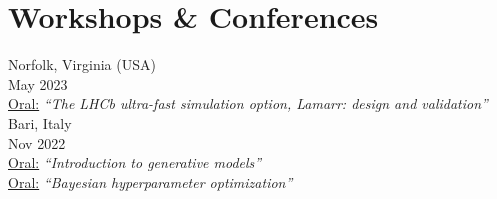 \newcommand{\contribution}[3][]
  {\normalsize \color{maincolor} \ul{#2:} \emph{``#3''} {#1}}

\newcommand{\nohref}
  {\normalsize \color{hlcolor-2} {-}}
  

\section*{Workshops \& Conferences}
\begin{cvcontent}
  \hypertarget{chep-2023}{\null}\noindent
    {Norfolk, Virginia (USA)}\\ [0.5mm]
    {May 2023}\\ [0.5mm]
  \contribution{Oral}{The LHCb ultra-fast simulation option, Lamarr: design and validation}
  \hfill
  \href{https://indico.jlab.org/event/459/contributions/11454/attachments/9426/14314/Lamarr_mbarbetti_CHEP2023.pdf}{\faFilePdf[regular]}
  \href{https://indico.jlab.org/event/459/contributions/11454}{\faGlobe}
  \\ [5mm]
  \hypertarget{mlinfn-2022}{\null}\noindent
    {Bari, Italy}\\ [0.5mm]
    {Nov 2022}\\ [0.5mm]
  \contribution{Oral}{Introduction to generative models}
  \hfill
  \href{https://docs.google.com/presentation/d/e/2PACX-1vS2S5IDMRu2MXpZPejKnDinGpjC49L-ayQ6JgW7l86XGRPQ2b6S8vAUxndenxFPJ5yr5RWqes_RlWRL/pub?start=false&loop=false&delayms=60000&slide=id.g17a7e76d956_0_3867}{\faLink}
  \href{https://agenda.infn.it/event/32568/contributions/180759/attachments/99417/138110/intro_gen_models-3rd_mlinfn_hackathon.pdf}{\faFilePdf[regular]}
  \href{https://agenda.infn.it/event/32568/contributions/180759}{\faGlobe}
  \\ [0.5mm]
  \contribution{Oral}{Bayesian hyperparameter optimization}
  \hfill
  \href{https://docs.google.com/presentation/d/e/2PACX-1vQMBlMTBN10DqsvPWoYhwrEt789ZOl7hjbu08LfXMIBvIGh0jBYoyzUxs5R7NYpCviMa4F4xwVWtPDU/pub?start=false&loop=false&delayms=10000&slide=id.g17ab1ea1d03_0_69}{\faLink}
  \href{https://agenda.infn.it/event/32568/contributions/180769/attachments/99647/138397/bayes_hp_opt-3rd_mlinfn_hackathon.pdf}{\faFilePdf[regular]}
  \href{https://agenda.infn.it/event/32568/contributions/180769}{\faGlobe}

\end{cvcontent}

